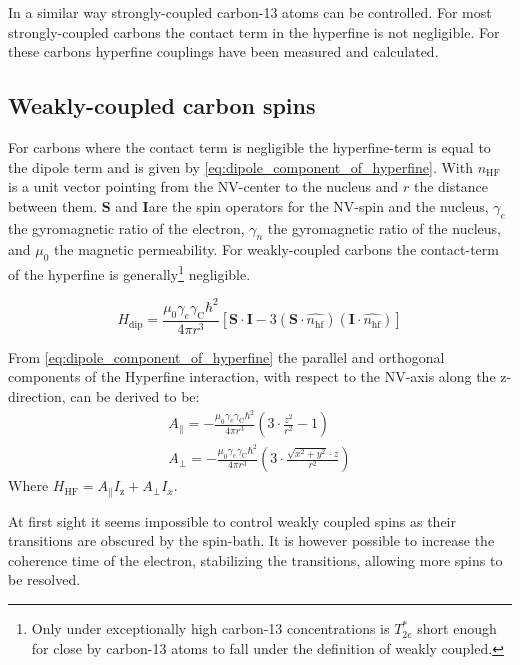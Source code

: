 In a similar way strongly-coupled carbon-13 atoms can be controlled\citep{Robledo2011HighFidelity}.
For most strongly-coupled carbons the contact term in the hyperfine is not negligible.
For these carbons hyperfine couplings have been measured\citep{Smeltzer201113} and calculated\citep{Gali2008Ab,Gali2009Identification}.

\subsection{Weakly-coupled carbon spins}
For carbons where the contact term is negligible the hyperfine-term is equal to the dipole term and is given by \cref{eq:dipole_component_of_hyperfine}\citep{Lange2012Quantum}.
With $n_\mathrm{HF}$ is a unit vector pointing from the NV-center to the nucleus and $r$ the distance between them.
$\mathbf{S}$ and $\mathbf{I}$are the spin operators for the NV-spin and the nucleus, $\gamma_e $ the gyromagnetic ratio of the electron, $\gamma_n$ the gyromagnetic ratio of the nucleus, and $\mu_0$ the magnetic permeability.
For weakly-coupled carbons the contact-term of the hyperfine is generally\footnote{Only under exceptionally high carbon-13 concentrations is $T_{2e}^*$ short enough for close by carbon-13 atoms to fall under the definition of weakly coupled. } negligible.

\begin{equation}
\label{eq:dipole_component_of_hyperfine}
H_{\mathrm{dip}} = \frac{\mu_0 \gamma_e \gamma_{\mathrm{C}} \hbar^2 }{4 \pi r^3} [ \bm{S \cdot I} - 3 (\bm S \cdot \hat{n_{\mathrm{hf}}})(\bm I \cdot \hat{n_{\mathrm{hf}}})]
\end{equation}

From \cref{eq:dipole_component_of_hyperfine}  the parallel and orthogonal components of the Hyperfine interaction, with respect to the NV-axis along the z-direction, can be derived to be:
 \begin{eqnarray}
A_\parallel= - \frac{\mu_0 \gamma_e \gamma_{\mathrm{C}} \hbar^2 }{4 \pi r^3} \left(3\cdot \frac{z^2}{r^2}-1\right)\\
 A_\perp =  -\frac{\mu_0 \gamma_e \gamma_{\mathrm{C}} \hbar^2 }{4 \pi r^3}\left( 3\cdot\frac{\sqrt{x^2+y^2}\cdot z}{r^2}\right)
\end{eqnarray}
Where $H_{\mathrm{HF}} = A_\parallel I_\mathrm{z} + A_\perp I_x $.

At first sight it seems impossible to control weakly coupled spins as their transitions are obscured by the spin-bath.
It is however possible to increase the coherence time of the electron, stabilizing the transitions, allowing more spins to be resolved.

